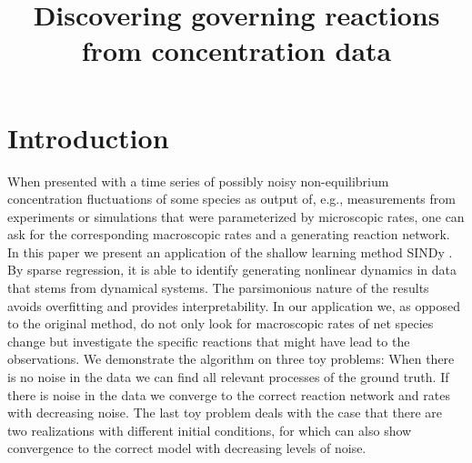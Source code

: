 \documentclass[oneside, abstracton, titlepage]{scrartcl}
\begin{document}
	\title{Discovering governing reactions from concentration data}
	\maketitle

	\section{Introduction}
	When presented with a time series of possibly noisy non-equilibrium concentration fluctuations of some species as output of, e.g., measurements from experiments or simulations that were parameterized by microscopic rates, one can ask for the corresponding macroscopic rates and a generating reaction network.
	In this paper we present an application of the shallow learning method SINDy \cite{Brunton2015}. By sparse regression, it is able to identify generating nonlinear dynamics in data that stems from dynamical systems. The parsimonious nature of the results avoids overfitting and provides interpretability.
	In our application we, as opposed to the original method, do not only look for macroscopic rates of net species change but investigate the specific reactions that might have lead to the observations.
	We demonstrate the algorithm on three toy problems: When there is no noise in the data we can find all relevant processes of the ground truth. If there is noise in the data we converge to the correct reaction network and rates with decreasing noise. The last toy problem deals with the case that there are two realizations with different initial conditions, for which can also show convergence to the correct model with decreasing levels of noise.
\end{document}

